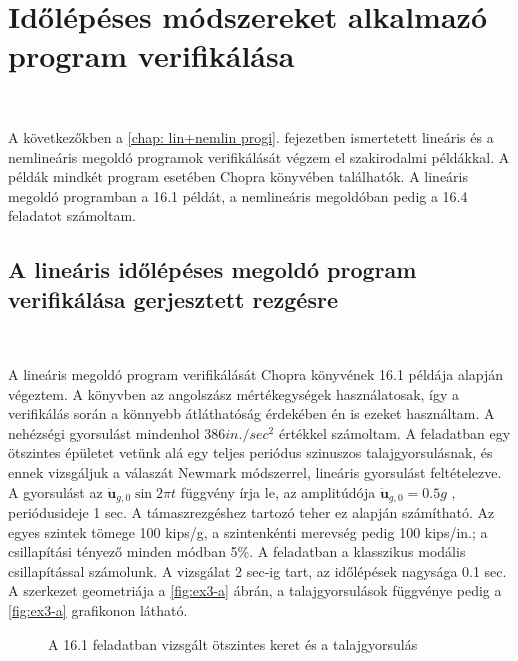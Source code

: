 \chapter[Időlépéses program verifikálása]{Időlépéses módszereket alkalmazó program verifikálása}\label{chap: lin+nemlin verif.}

{\ }

A következőkben a \ref{chap: lin+nemlin progi}. fejezetben ismertetett lineáris  és a nemlineáris megoldó programok verifikálását végzem el szakirodalmi példákkal. A példák mindkét program esetében  Chopra könyvében \cite{chopra}  találhatók. A lineáris megoldó programban a 16.1 példát, a nemlineáris megoldóban pedig a 16.4 feladatot számoltam.


\section{A lineáris időlépéses megoldó program verifikálása gerjesztett rezgésre}\label{sec:linver}

{\ } 

A lineáris megoldó program verifikálását Chopra könyvének \cite{chopra} 16.1 példája alapján végeztem.   A könyvben az angolszász mértékegységek használatosak, így a verifikálás során a könnyebb átláthatóság érdekében én is ezeket használtam. A nehézségi gyorsulást mindenhol $386 in./sec^2$ értékkel számoltam. A feladatban egy ötszintes épületet vetünk alá egy teljes periódus szinuszos talajgyorsulásnak, és ennek vizsgáljuk a válaszát Newmark módszerrel, lineáris gyorsulást feltételezve. A  gyorsulást az $\mathbf{\ddot{u}}_{g,0}\sin{2\pi{t}}$ függvény írja le, az amplitúdója  $\mathbf{\ddot{u}}_{g,0} = 0.5 g$ , periódusideje 1 sec. A támaszrezgéshez tartozó teher ez alapján számítható. Az egyes szintek tömege 100 kips/g, a szintenkénti merevség pedig 100 kips/in.; a csillapítási tényező minden módban 5\%. A feladatban a klasszikus modális csillapítással számolunk. A vizsgálat 2 sec-ig tart, az időlépések nagysága 0.1 sec. A szerkezet geometriája a \ref{fig:ex3-a} ábrán, a talajgyorsulások függvénye pedig a \ref{fig:ex3-a} grafikonon látható.



\begin{figure}%
\centering
{}%
\hspace{8pt}%
%
\caption[A \cite{chopra} 16.1 feladatban vizsgált ötszintes keret és a  talajgyorsulás.]{ A \cite{chopra} 16.1 feladatban vizsgált ötszintes keret és   a  talajgyorsulás}
 \label{fig:41}%
\end{figure}

